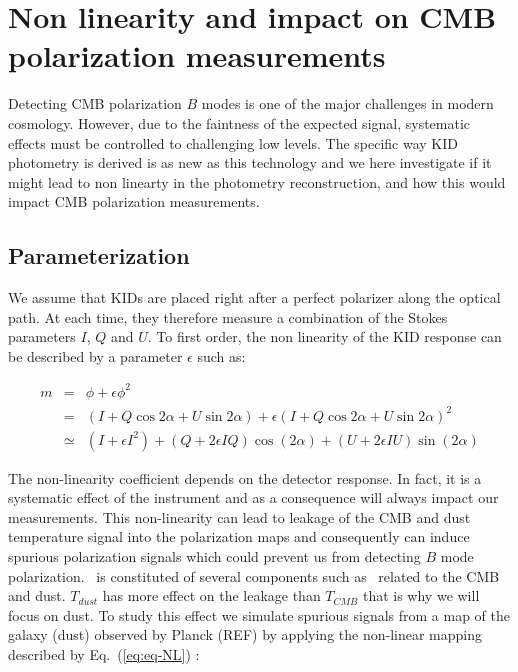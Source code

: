 \section{Non linearity and impact on CMB polarization measurements}
\label{sec:cmb}

Detecting CMB polarization $B$ modes is one of the major challenges in modern
cosmology. However, due to the faintness of the expected signal, systematic
effects must be controlled to challenging low levels. The specific way KID
photometry is derived is as new as this technology and we here investigate if it
might lead to non linearty in the photometry reconstruction, and how this would
impact CMB polarization measurements.

\subsection{Parameterization}

We assume that KIDs are placed right after a perfect polarizer along the optical
path. At each time, they therefore measure a combination of the Stokes
parameters $I$, $Q$ and $U$. To first order, the non linearity of the KID
response can be described by a parameter $\epsilon$ such as:

\begin{eqnarray}
m &=& \phi + \epsilon\phi^2 \nonumber \\
&=& (I+Q\cos2\alpha+U\sin2\alpha) + \epsilon(I+Q\cos2\alpha+U\sin2\alpha)^2 \nonumber\\
 &\simeq & (I + \epsilon I^{2}) + (Q + 2\epsilon IQ) \cos(2\alpha) + (U + 2 \epsilon IU) \sin(2\alpha)
\label{eq:eq-NL}
\end{eqnarray}

The non-linearity coefficient depends on the detector response. In fact, it is a systematic effect of the instrument and as a consequence will always impact our measurements. This non-linearity can lead to leakage of the CMB and dust temperature signal into the polarization maps and consequently can induce spurious polarization signals which could prevent us from detecting $B$ mode polarization. \eps\ is constituted of several components such as \eps\ related to the CMB and dust. $T_{dust}$ has more effect on the leakage than $T_{CMB}$  that is why we will focus on dust.
To study this effect we simulate spurious signals from a map of the galaxy (dust) observed by Planck (REF) by applying the non-linear mapping described by Eq.~(\ref{eq:eq-NL}) :

